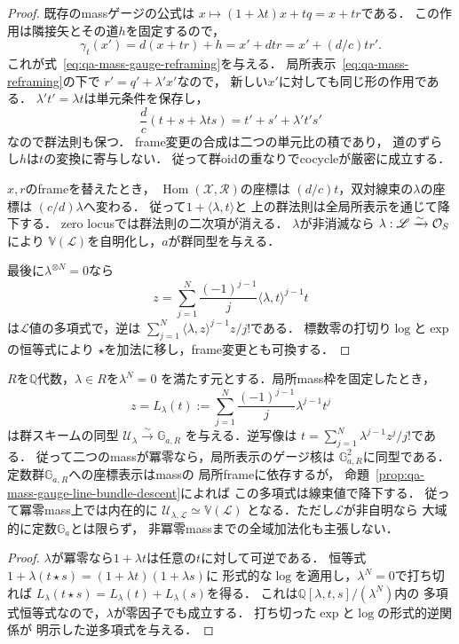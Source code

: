 \begin{proof}
既存のmassゲージの公式は
$x\mapsto(1+\lambda t)x+tq=x+t r$である．
この作用は隣接矢とその道$h$を固定するので，
\[
 \gamma_t(x')
 =d(x+t r)+h=x'+d t r
 =x'+(d/c)t r' .
\]
これが式~\eqref{eq:qa-mass-gauge-reframing}を与える．
局所表示~\eqref{eq:qa-mass-reframing}の下で
$r'=q'+\lambda'x'$なので，
新しい$x'$に対しても同じ形の作用である．
$\lambda't'=\lambda t$は単元条件を保存し，
\[
 \frac dc(t+s+\lambda ts)
 =t'+s'+\lambda't's'
\]
なので群法則も保つ．
frame変更の合成は二つの単元比の積であり，
道のずらし$h$は$t$の変換に寄与しない．
従って群oidの重なりでcocycleが厳密に成立する．

$x,r$のframeを替えたとき，
$\operatorname{Hom}(\mathscr X,\mathscr R)$の座標は
$(d/c)t$，双対線束の$\lambda$の座標は
$(c/d)\lambda$へ変わる．
従って$1+\langle\lambda,t\rangle$と
上の群法則は全局所表示を通じて降下する．
zero locusでは群法則の二次項が消える．
$\lambda$が非消滅なら
$\lambda:\mathscr L\xrightarrow{\sim}\mathcal O_S$により
$\mathbb V(\mathscr L)$を自明化し，$a$が群同型を与える．

最後に$\lambda^{\otimes N}=0$なら
\[
 z=\sum_{j=1}^{N}
   \frac{(-1)^{j-1}}j
     \langle\lambda,t\rangle^{j-1}t
\]
は$\mathscr L$値の多項式で，逆は
$\sum_{j=1}^{N}
 \langle\lambda,z\rangle^{j-1}z/j!$である．
標数零の打切り$\log$と$\exp$の恒等式により
$\star$を加法に移し，frame変更とも可換する．
\end{proof}

\begin{lemma}[冪零mass上の滑らかなゲージの加法座標]
\label{lem:qa-mass-gauge-nilpotent-log}
$R$を$\mathbb Q$代数，$\lambda\in R$を$\lambda^N=0$
を満たす元とする．局所mass枠を固定したとき，
\[
 z=L_\lambda(t):=
   \sum_{j=1}^{N}
       \frac{(-1)^{j-1}}{j}\lambda^{j-1}t^j
\]
は群スキームの同型
$\mathcal U_\lambda\xrightarrow{\sim}\mathbb G_{a,R}$
を与える．逆写像は
$t=\sum_{j=1}^{N}\lambda^{j-1}z^j/j!$である．
従って二つのmassが冪零なら，局所表示のゲージ核は
$\mathbb G_{a,R}^2$に同型である．
定数群$\mathbb G_{a,R}$への座標表示はmassの
局所frameに依存するが，
命題~\ref{prop:qa-mass-gauge-line-bundle-descent}によれば
この多項式は線束値で降下する．
従って冪零mass上では内在的に
$\mathcal U_{\lambda,\mathscr L}\simeq\mathbb V(\mathscr L)$
となる．ただし$\mathscr L$が非自明なら
大域的に定数$\mathbb G_a$とは限らず，
非冪零massまでの全域加法化も主張しない．
\end{lemma}
\begin{proof}
$\lambda$が冪零なら$1+\lambda t$は任意の$t$に対して可逆である．
恒等式
$1+\lambda(t\star s)=(1+\lambda t)(1+\lambda s)$に
形式的な$\log$を適用し，$\lambda^N=0$で打ち切れば
$L_\lambda(t\star s)=L_\lambda(t)+L_\lambda(s)$を得る．
これは$\mathbb Q[\lambda,t,s]/(\lambda^N)$内の
多項式恒等式なので，$\lambda$が零因子でも成立する．
打ち切った$\exp$と$\log$の形式的逆関係が
明示した逆多項式を与える．
\end{proof}


